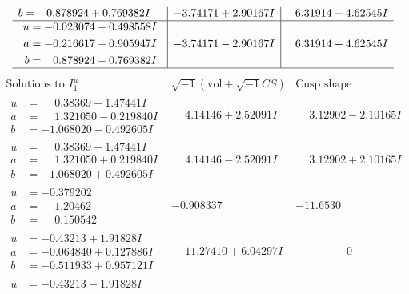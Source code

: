 \documentclass[1p]{elsarticle_modified}
\theoremstyle{definition}
\newcommand{\I}{\sqrt{-1}}
\begin{document}
$$\begin{array}{c|c|c}
\begin{aligned}
b &= \phantom{-}0.878924 + 0.769382 I\end{aligned}
 & -3.74171 + 2.90167 I & \phantom{-}6.31914 - 4.62545 I \\ \hline\begin{aligned}
u &= -0.023074 - 0.498558 I \\
a &= -0.216617 - 0.905947 I \\
b &= \phantom{-}0.878924 - 0.769382 I\end{aligned}
 & -3.74171 - 2.90167 I & \phantom{-}6.31914 + 4.62545 I\\
 \hline 
 \end{array}$$\newpage$$\begin{array}{c|c|c}  
\text{Solutions to }I^u_{1}& \I (\text{vol} + \sqrt{-1}CS) & \text{Cusp shape}\\
 \hline 
\begin{aligned}
u &= \phantom{-}0.38369 + 1.47441 I \\
a &= \phantom{-}1.321050 - 0.219840 I \\
b &= -1.068020 - 0.492605 I\end{aligned}
 & \phantom{-}4.14146 + 2.52091 I & \phantom{-}3.12902 - 2.10165 I \\ \hline\begin{aligned}
u &= \phantom{-}0.38369 - 1.47441 I \\
a &= \phantom{-}1.321050 + 0.219840 I \\
b &= -1.068020 + 0.492605 I\end{aligned}
 & \phantom{-}4.14146 - 2.52091 I & \phantom{-}3.12902 + 2.10165 I \\ \hline\begin{aligned}
u &= -0.379202\phantom{ +0.000000I} \\
a &= \phantom{-}1.20462\phantom{ +0.000000I} \\
b &= \phantom{-}0.150542\phantom{ +0.000000I}\end{aligned}
 & -0.908337\phantom{ +0.000000I} & -11.6530\phantom{ +0.000000I} \\ \hline\begin{aligned}
u &= -0.43213 + 1.91828 I \\
a &= -0.064840 + 0.127886 I \\
b &= -0.511933 + 0.957121 I\end{aligned}
 & \phantom{-}11.27410 + 6.04297 I & \phantom{-0.000000 } 0 \\ \hline\begin{aligned}
u &= -0.43213 - 1.91828 I \\

\end{aligned}
\end{array}$$
\end{document}
